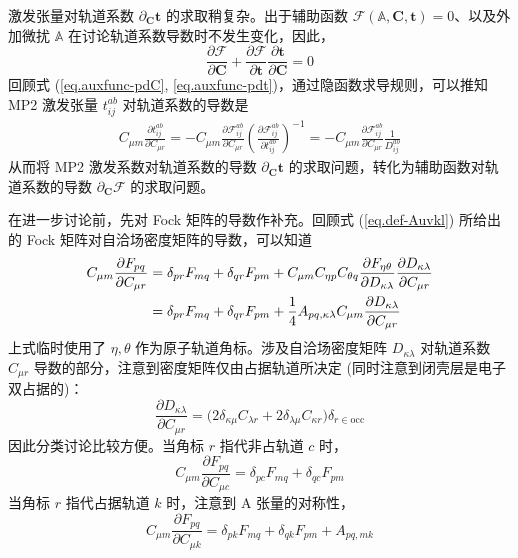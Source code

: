 激发张量对轨道系数 $\partial_\mathbf{C} \mathbf{t}$ 的求取稍复杂。出于辅助函数 $\pmb{\mathscr{F}} (\mathbb{A}, \mathbf{C}, \mathbf{t}) = 0$、以及外加微扰 $\mathbb{A}$ 在讨论轨道系数导数时不发生变化，因此，
\begin{equation}
  \label{eq.auxfunc-pdC}
  \frac{\partial \pmb{\mathscr{F}}}{\partial \mathbf{C}} + \frac{\partial \pmb{\mathscr{F}}}{\partial \mathbf{t}} \frac{\partial \mathbf{t}}{\partial \mathbf{C}} = 0
\end{equation}
回顾式 (\ref{eq.auxfunc-pdC}, \ref{eq.auxfunc-pdt})，通过隐函数求导规则，可以推知 MP2 激发张量 $t_{ij}^{ab}$ 对轨道系数的导数是
\begin{align}
  \label{eq.relation-tpdc-fpdc}
  C_{\mu m} \frac{\partial t_{ij}^{ab}}{\partial C_{\mu r}}
  = - C_{\mu m} \frac{\partial \mathscr{F}_{ij}^{ab}}{\partial C_{\mu r}} \left( \frac{\partial \mathscr{F}_{ij}^{ab}}{\partial t_{ij}^{ab}} \right)^{-1}
  = - C_{\mu m} \frac{\partial \mathscr{F}_{ij}^{ab}}{\partial C_{\mu r}} \frac{1}{D_{ij}^{ab}}
\end{align}
从而将 MP2 激发系数对轨道系数的导数 $\partial_\mathbf{C} \mathbf{t}$ 的求取问题，转化为辅助函数对轨道系数的导数 $\partial_\mathbf{C} \pmb{\mathscr{F}}$ 的求取问题。

在进一步讨论前，先对 Fock 矩阵的导数作补充。回顾式 (\ref{eq.def-Auvkl}) 所给出的 Fock 矩阵对自洽场密度矩阵的导数，可以知道
\begin{align}
  C_{\mu m} \frac{\partial F_{pq}}{\partial C_{\mu r}} &= \delta_{pr} F_{mq} + \delta_{qr} F_{pm} + C_{\mu m} C_{\eta p} C_{\theta q} \frac{\partial F_{\eta \theta}}{\partial D_{\kappa \lambda}} \frac{\partial D_{\kappa \lambda}}{\partial C_{\mu r}} \notag\\
  &= \delta_{pr} F_{mq} + \delta_{qr} F_{pm} + \frac{1}{4} A_{pq, \kappa \lambda} C_{\mu m} \frac{\partial D_{\kappa \lambda}}{\partial C_{\mu r}}
\end{align}
上式临时使用了 $\eta, \theta$ 作为原子轨道角标。涉及自洽场密度矩阵 $D_{\kappa \lambda}$ 对轨道系数 $C_{\mu r}$ 导数的部分，注意到密度矩阵仅由占据轨道所决定 (同时注意到闭壳层是电子双占据的)：
\begin{equation}
  \frac{\partial D_{\kappa \lambda}}{\partial C_{\mu r}} = \big( 2 \delta_{\kappa \mu} C_{\lambda r} + 2 \delta_{\lambda \mu} C_{\kappa r} \big) \delta_{r \in \mathrm{occ}}
\end{equation}
因此分类讨论比较方便。当角标 $r$ 指代非占轨道 $c$ 时，
\begin{equation}
  C_{\mu m} \frac{\partial F_{pq}}{\partial C_{\mu c}} = \delta_{pc} F_{mq} + \delta_{qc} F_{pm}
\end{equation}
当角标 $r$ 指代占据轨道 $k$ 时，注意到 A 张量的对称性，
\begin{equation}
  C_{\mu m} \frac{\partial F_{pq}}{\partial C_{\mu k}} = \delta_{pk} F_{mq} + \delta_{qk} F_{pm} + A_{pq, mk}
\end{equation}


